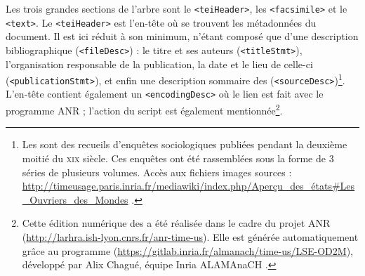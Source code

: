 Les trois grandes sections de l'arbre sont le \texttt{<teiHeader>}, les \texttt{<facsimile>} et le \texttt{<text>}. Le \texttt{<teiHeader>} est l'en-tête où se trouvent les métadonnées du document. Il est ici réduit à son minimum, n'étant composé que d'une description bibliographique (\texttt{<fileDesc>}) : le titre et ses auteurs (\texttt{<titleStmt>}), l'organisation responsable de la publication, la date et le lieu de celle-ci (\texttt{<publicationStmt>}), et enfin une description sommaire des \odm{} (\texttt{<sourceDesc>})\footnote{\og Les \odm{} sont des recueils d'enquêtes sociologiques publiées pendant la deuxième moitié du \textsc{xix}\ieme{} siècle. Ces enquêtes ont été rassemblées sous la forme de 3 séries de plusieurs volumes. Accès aux fichiers images sources : \url{http://timeusage.paris.inria.fr/mediawiki/index.php/Aperçu_des_états\#Les_Ouvriers_des_Mondes} \fg.}. L'en-tête contient également un \texttt{<encodingDesc>} où le lien est fait avec le programme ANR ; l'action du script \lse{} est également mentionnée\footnote{\og Cette édition numérique des \odm{} a été réalisée dans le cadre du projet ANR \timeus{} (\url{http://larhra.ish-lyon.cnrs.fr/anr-time-us}). Elle est générée automatiquement grâce au programme \lse{} (\url{https://gitlab.inria.fr/almanach/time-us/LSE-OD2M}), développé par Alix Chagué, équipe Inria ALAMAnaCH \fg.}.

